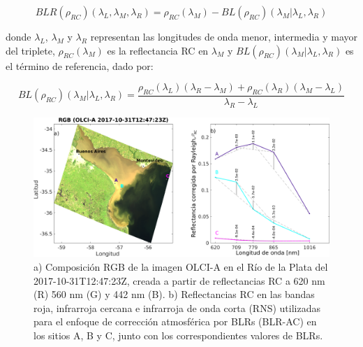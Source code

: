     \begin{equation}
        BLR(\rho_{RC})(\lambda_{L}, \lambda_{M}, \lambda_{R}) = \rho_{RC}(\lambda_{M})-BL(\rho_{RC})(\lambda_{M}|\lambda_{L},\lambda_{R})
        \label{blr:eq:blr}
    \end{equation}
    
    \noindent donde $\lambda_{L}$, $\lambda_{M}$ y $\lambda_{R}$ representan las longitudes de onda menor, intermedia y mayor del triplete, $\rho_{RC}(\lambda_{M}) $ es la reflectancia RC en $\lambda_{M}$ y $BL(\rho_{RC})(\lambda_{M} |\lambda_{L},\lambda_{R}) $ es el término de referencia, dado por:
    
    \begin{equation}
    BL(\rho_{RC})(\lambda_{M}|\lambda_{L},\lambda_{R}) =   \frac{\rho_{RC}(\lambda_{L})(\lambda_{R}-\lambda_{M})+\rho_{RC}(\lambda_{R})(\lambda_{M}-\lambda_{L})}{\lambda_{R}-\lambda_{L}}
    \label{blr:eq:baseline}
    \end{equation}
    
    \begin{figure}
    \centering
    \includegraphics[width=\textwidth]{blr/figures/blrExamles}
    \caption[Ejemplos de BLRs en distintos regímenes de SPM en la imagen OLCI-A 2017-10-31T12:47:23Z sobre el RdP]{a) Composición RGB de la imagen OLCI-A en el Río de la Plata del 2017-10-31T12:47:23Z, creada a partir de reflectancias RC a 620 nm (R) 560 nm (G) y 442 nm (B). b) Reflectancias RC en las bandas roja, infrarroja cercana e infrarroja de onda corta (RNS) utilizadas para el enfoque de corrección atmosférica por BLRs (BLR-AC) en los sitios A, B y C, junto con los correspondientes valores de BLRs.}
    \label{blr:blrExamples}
    \end{figure}
    
